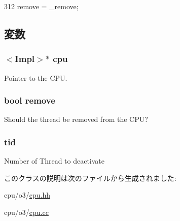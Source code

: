 \begin{DoxyCode}
312 { remove = _remove; }
\end{DoxyCode}


\subsection{変数}
\hypertarget{classFullO3CPU_1_1DeallocateContextEvent_a3a3767255bcefd2ce55f94976ab8eb99}{
\subsubsection[{cpu}]{$<$Impl$>$$\ast$ {\bf cpu}}}
\label{classFullO3CPU_1_1DeallocateContextEvent_a3a3767255bcefd2ce55f94976ab8eb99}
Pointer to the CPU. \hypertarget{classFullO3CPU_1_1DeallocateContextEvent_a85e26bd0985e6b9f842e0f195beccb6c}{
\subsubsection[{remove}]{\setlength{\rightskip}{0pt plus 5cm}bool {\bf remove}}}
\label{classFullO3CPU_1_1DeallocateContextEvent_a85e26bd0985e6b9f842e0f195beccb6c}
Should the thread be removed from the CPU? \hypertarget{classFullO3CPU_1_1DeallocateContextEvent_aa508770268ee4ceaf16054b9e0be0e17}{
\subsubsection[{tid}]{ {\bf tid}}}
\label{classFullO3CPU_1_1DeallocateContextEvent_aa508770268ee4ceaf16054b9e0be0e17}
Number of Thread to deactivate 

このクラスの説明は次のファイルから生成されました:\begin{DoxyCompactItemize}
\item 
cpu/o3/\hyperlink{o3_2cpu_8hh}{cpu.hh}\item 
cpu/o3/\hyperlink{o3_2cpu_8cc}{cpu.cc}\end{DoxyCompactItemize}
